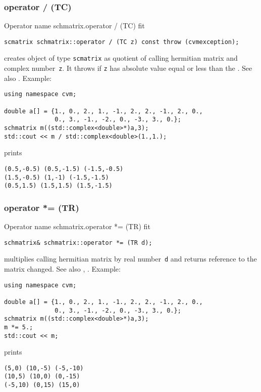 \subsubsection{operator / (TC)}
Operator%
\pdfdest name {schmatrix.operator / (TC)} fit
\begin{verbatim}
scmatrix schmatrix::operator / (TC z) const throw (cvmexception);
\end{verbatim}
creates  object of type \verb"scmatrix" as  quotient of
 calling hermitian matrix and  complex number~\verb"z". 
It throws
if \verb"z" has  absolute value equal or less than the
.
See also .
Example:
\begin{Verbatim}
using namespace cvm;

double a[] = {1., 0., 2., 1., -1., 2., 2., -1., 2., 0.,
              0., 3., -1., -2., 0., -3., 3., 0.};
schmatrix m((std::complex<double>*)a,3);
std::cout << m / std::complex<double>(1.,1.);
\end{Verbatim}
prints
\begin{Verbatim}
(0.5,-0.5) (0.5,-1.5) (-1.5,-0.5)
(1.5,-0.5) (1,-1) (-1.5,-1.5)
(0.5,1.5) (1.5,1.5) (1.5,-1.5)
\end{Verbatim}
\newpage



\subsubsection{operator *= (TR)}
Operator%
\pdfdest name {schmatrix.operator *= (TR)} fit
\begin{verbatim}
schmatrix& schmatrix::operator *= (TR d);
\end{verbatim}
multiplies  calling hermitian matrix by  real number~\verb"d"
and returns  reference to
the matrix changed.
See also ,
.
Example:
\begin{Verbatim}
using namespace cvm;

double a[] = {1., 0., 2., 1., -1., 2., 2., -1., 2., 0.,
              0., 3., -1., -2., 0., -3., 3., 0.};
schmatrix m((std::complex<double>*)a,3);
m *= 5.;
std::cout << m;
\end{Verbatim}
prints
\begin{Verbatim}
(5,0) (10,-5) (-5,-10)
(10,5) (10,0) (0,-15)
(-5,10) (0,15) (15,0)
\end{Verbatim}
\newpage



